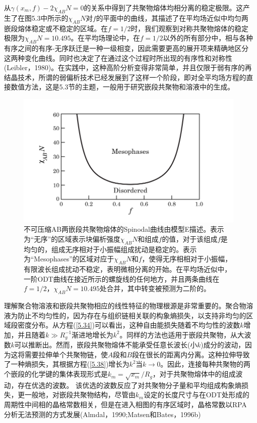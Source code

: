 从$\gamma(x_m,f)-2\chi_{AB}N=0$的关系中得到了共聚物熔体均相分离的稳定极限。这产生了在图5.3中所示的$\chi_{AB}N$对$f$的平面中的曲线，其描述了在平均场近似中均匀两嵌段熔体稳定或不稳定的区域。在$f=1/2$时，我们观察到对称共聚物熔体的稳定极限为$\chi_{AB}N=10.495$。在平均场理论中，在$f=1/2$以外的所有部分中，相与各种有序之间的有序-无序跃迁是一种一级相变，因此需要更高的展开项来精确地区分这两种变化曲线。同时也决定了在通过这个过程时所出现的有序性和对称性(Leibler，1980)。在实践中，这种高阶分析变得非常简单，并且仅限于弱有序的再结晶技术，所谓的弱偏析技术已经发展到了这样一个阶段，即对全平均场方程的直接数值方法，这是5.3节的主题，一般用于研究嵌段共聚物和溶液中的生成。
\begin{figure}[H]
      \centering
      \includegraphics[width=12cm]{./figures/4.png}
      \caption{不可压缩AB两嵌段共聚物熔体的Spinodal曲线由模型E描述。表示为“无序”的区域表示块偏析强度$\chi_{AB}N$和组成$f$的值，对于该组成$f$是均匀的，组成无序相对于小振幅组成扰动是稳定的。表示为“Mesophases”的区域对应于$\chi_{AB}N$和$f$，使得无序相相对于小振幅，有限波长组成扰动不稳定，表明微相分离的开始。在平均场近似中，一阶ODT曲线在接近所示的螺旋线的任何地方，并且两条曲线在$f=1/2$，$\chi_{AB}N=10.495$处合并，其中转变被预测为二阶的。}
\end{figure}
理解聚合物溶液和嵌段共聚物相应的线性特征的物理根源是非常重要的。聚合物溶液为防止不均匀性的，因为存在与组织链相关联的构象熵损失，以支持非均匀的区域段密度分布。从方程(\ref{5.34})可以看出，这种自由能损失随着不均匀性的波数$k$增加，并且随着$k\gg R_g^{-1}$渐进地增长为$k^2$。同样的方法也适用于嵌段共聚物，从大波数$k$可以推断出。然而，嵌段共聚物熔体不能承受任意长波长(小$k$)成分的波动，因为这将需要拉伸单个共聚物链，使$A$段和$B$段在很长的距离内分离。这种拉伸导致了一种熵损失，其根据方程(\ref{5.38})增长为$k^2$当$k\rightarrow 0$。因此，连接每种共聚物的两个嵌段的化学键的集体表现形式是$k_m=\sqrt{x_m}/R_g$，对于共聚物熔体中的组成波动，存在优选的波数。
该优选的波数反应了对共聚物分子量和平均组成构象熵损失，更一般地，对嵌段共聚物结构，尽管由$k_m$设定的长度尺寸与在ODT处形成的周期性中间相的晶格常数相关，但是在进入相图的有序区域时，晶格常数以RPA分析无法预测的方式发展(Almdal，1990;Matsen和Bates，1996b)

